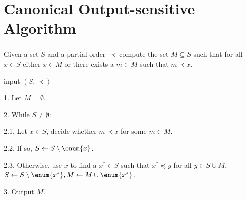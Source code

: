 \section{Canonical Output-sensitive Algorithm}
\begin{frame}\frametitle{\insertsection}\justifying
\begin{probl}
Given a set \(S\) and a partial order \(\prec\) compute the set \(M \subseteq S\)
such that for all \(x \in S\) either \(x \in M\) or there exists a \(m \in M\)
such that \(m \prec x\).
\end{probl}
\pause
\begin{algo}
\item[input] \((S, \prec)\)
\item[1.] Let \(M = \emptyset\).
\item[2.] While \(S \neq \emptyset\):
\item[2.1.] Let \(x \in S\), decide whether \(m \prec x\) for some \(m \in M\).
\item[2.2.] If so, \(S \gets S \setminus \enum{x}\).
\item[2.3.] Otherwise, use \(x\) to find a \(x^* \in S\) such that \(x^*
	\preceq y\) for all \(y \in S \cup M\). \(S \gets S \setminus \enum{x^*}, M
	\gets M \cup \enum{x^*}\).
\item[3.] Output \(M\).
\end{algo}
\end{frame}
